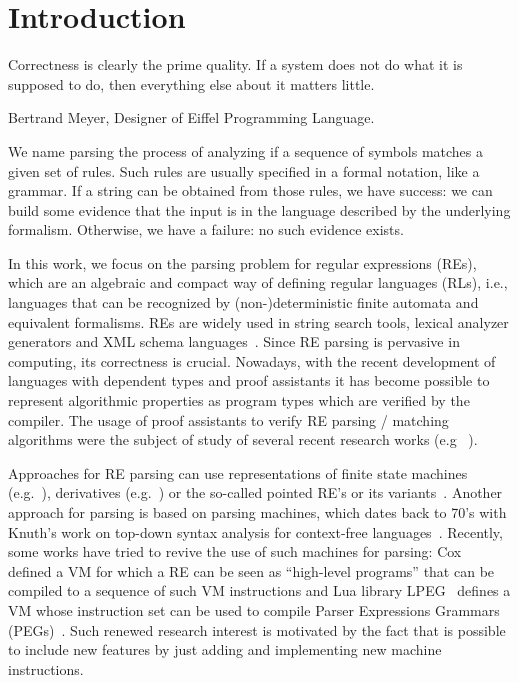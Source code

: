 \documentclass[oneside,12pt]{scrbook}
\theoremstyle{definition}
\theoremstyle{plain}
\theoremstyle{definition}
\begin{document}


\mainmatter

\chapter{Introduction}\label{chapter:introduction}

\epigraph{Correctness is clearly the prime quality. If a system does
  not do what it is supposed to do, then everything else about it
  matters little.}{Bertrand Meyer, Designer of Eiffel Programming Language.}


We name parsing the process of analyzing if a sequence of symbols matches a given set of rules.
Such rules are usually specified in a formal notation, like a grammar. If a string can be obtained
from those rules, we have success: we can build some evidence that the input is in the language
described by the underlying formalism. Otherwise, we have a failure: no such evidence exists.

In this work, we focus on the parsing problem for regular expressions (REs), which are an algebraic
and compact way of defining regular languages (RLs), i.e., languages that can be recognized by
(non-)deterministic finite automata and equivalent formalisms. REs are widely used in string search
tools, lexical analyzer generators and XML schema languages~\cite{Frisch2004}. Since RE parsing
is pervasive in computing, its correctness is crucial. Nowadays, with the recent
development of languages with dependent types and proof assistants it has become
possible to represent algorithmic properties as program types which are verified
by the compiler. The usage of proof assistants to verify RE parsing / matching algorithms
were the subject of study of several recent research works (e.g ~\cite{Firsov13,Ribeiro2017,Lopes2016,Asperti10}).

Approaches for RE parsing can use representations of finite state machines (e.g.~\cite{Firsov13}),
derivatives (e.g.~\cite{Ribeiro2017,Lopes2018,Lopes2016}) or the so-called pointed RE's or its
variants~\cite{Asperti10,Fischer2010}. Another approach for parsing is based on parsing machines, which dates back to 70's with Knuth's work
on top-down syntax analysis for context-free languages~\cite{Knuth71}. Recently, some works
have tried to revive the use of such machines for parsing: Cox~\cite{Cox2009} defined a VM
for which a RE can be seen as ``high-level programs'' that can be compiled to a sequence of
such VM instructions and Lua library LPEG~\cite{Ierusalimschy2009} defines a VM whose instruction
set can be used to compile Parser Expressions Grammars (PEGs)~\cite{Ford04}. Such renewed research
interest is motivated by the fact that is possible to include new features by just adding and
implementing new machine instructions.
\end{document}
